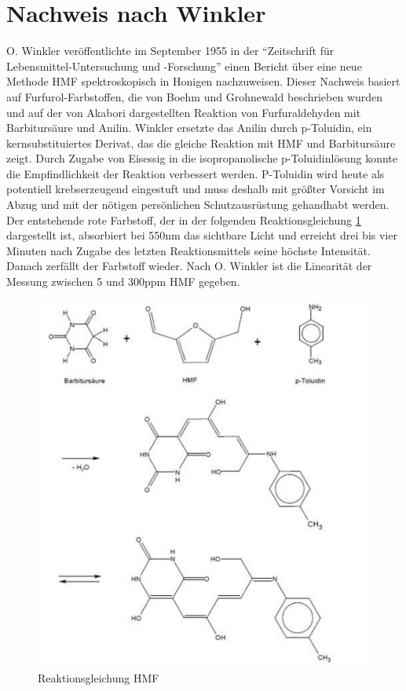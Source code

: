 \section{Nachweis nach Winkler}

O. Winkler veröffentlichte im September 1955 in der ``Zeitschrift für Lebensmittel-Untersuchung und -Forschung'' einen Bericht über eine neue Methode HMF spektroskopisch in Honigen nachzuweisen. Dieser Nachweis basiert auf Furfurol-Farbstoffen, die von Boehm und Grohnewald beschrieben wurden und auf der von Akabori dargestellten Reaktion von Furfuraldehyden mit Barbitursäure und Anilin. Winkler ersetzte das Anilin durch p-Toluidin, ein kernsubstituiertes Derivat, das die gleiche Reaktion mit HMF und Barbitursäure zeigt. Durch Zugabe von Eisessig in die isopropanolische p-Toluidinlösung konnte die Empfindlichkeit der Reaktion verbessert werden. P-Toluidin wird heute als potentiell krebserzeugend eingestuft und muss deshalb mit größter Vorsicht im Abzug und mit der nötigen persönlichen Schutzausrüstung gehandhabt werden.\\
Der entstehende rote Farbstoff, der in der folgenden Reaktionsgleichung \ref{fig:Farbreaktionsgleichung2} dargestellt ist, absorbiert bei 550nm das sichtbare Licht und erreicht drei bis vier Minuten nach Zugabe des letzten Reaktionsmittels seine höchste Intensität. Danach zerfällt der Farbstoff wieder. Nach O. Winkler ist die Linearität der Messung zwischen 5 und 300ppm HMF gegeben.~\cite{Winkler}

\begin{figure}[htbp]
	\centering
		\includegraphics[width=1.00\textwidth]{../Bilder/Farbreaktionsgleichung2.pdf}
	\caption{Reaktionsgleichung HMF}
	\label{fig:Farbreaktionsgleichung2}
\end{figure}

